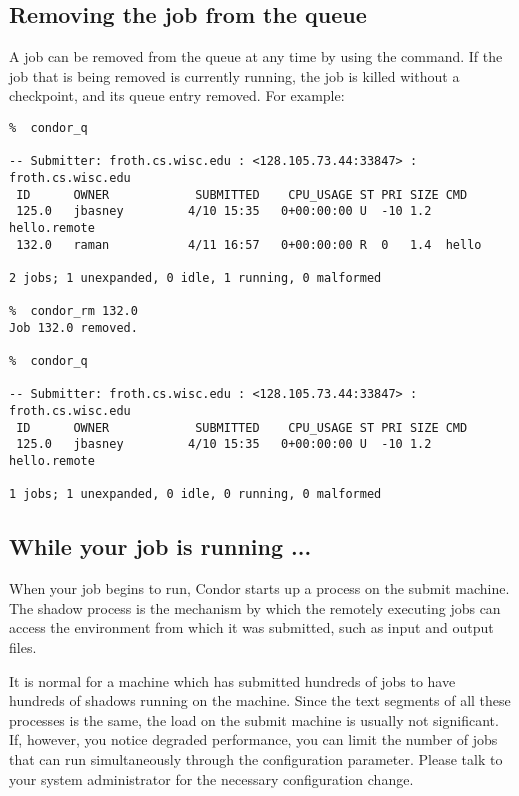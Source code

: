 \subsection{Removing the job from the queue}
A job can be removed from the queue at any time by using the 
command.  If the job that is being removed is currently running, the job
is killed without a checkpoint, and its queue entry removed.  For example:
\begin{verbatim}
%  condor_q

-- Submitter: froth.cs.wisc.edu : <128.105.73.44:33847> : froth.cs.wisc.edu
 ID      OWNER            SUBMITTED    CPU_USAGE ST PRI SIZE CMD               
 125.0   jbasney         4/10 15:35   0+00:00:00 U  -10 1.2  hello.remote      
 132.0   raman           4/11 16:57   0+00:00:00 R  0   1.4  hello             

2 jobs; 1 unexpanded, 0 idle, 1 running, 0 malformed

%  condor_rm 132.0
Job 132.0 removed.

%  condor_q

-- Submitter: froth.cs.wisc.edu : <128.105.73.44:33847> : froth.cs.wisc.edu
 ID      OWNER            SUBMITTED    CPU_USAGE ST PRI SIZE CMD               
 125.0   jbasney         4/10 15:35   0+00:00:00 U  -10 1.2  hello.remote      

1 jobs; 1 unexpanded, 0 idle, 0 running, 0 malformed
\end{verbatim}

\subsection{While your job is running ...}
When your job begins to run, Condor starts up a  process
on the submit machine.  The shadow process is the mechanism by which the
remotely executing jobs can access the environment from which it was
submitted, such as input and output files.  

It is normal for a machine which has submitted hundreds of jobs to have 
hundreds of shadows running on the machine.  Since the text segments of 
all these processes is the same, the load on the submit machine is usually 
not significant.  If, however, you notice degraded performance, you can limit 
the number of jobs that can run simultaneously through the 
 configuration parameter.  Please talk to your 
system administrator for the necessary configuration change.

